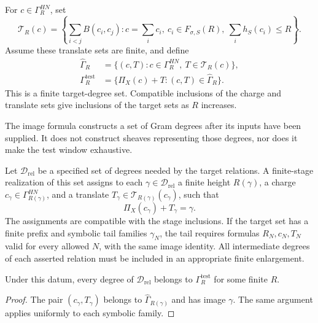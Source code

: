 \begin{definition}
\label{def:finite-target-test-window}
For \(c\in\Gamma_R^{HN}\), set
\[
 \mathcal T_R(c)=
 \left\{\sum_{i<j}B(c_i,c_j):
   c=\sum_i c_i,\ c_i\in F_{\sigma,S}(R),\
   \sum_i h_S(c_i)\le R\right\}.
\]
Assume these translate sets are finite, and define
\[
 \begin{split}
 \widehat\Gamma_R&=
    \{(c,T):c\in\Gamma_R^{HN},\ T\in\mathcal T_R(c)\},\\
 \Gamma_R^{\mathrm{test}}&=
    \{\Pi_X(c)+T:(c,T)\in\widehat\Gamma_R\}.
 \end{split}
\]
This is a finite target-degree set. Compatible inclusions of the
charge and translate sets give inclusions of the target sets as
\(R\) increases.
\end{definition}

The image formula constructs a set of Gram degrees after its inputs
have been supplied. It does not construct sheaves representing those
degrees, nor does it make the test window exhaustive.

\begin{definition}
\label{def:relation-closed-target-finite-r-exhaustion}
Let \(\mathcal D_{\mathrm{rel}}\) be a specified set of degrees
needed by the target relations. A finite-stage realization of this
set assigns to each \(\gamma\in\mathcal D_{\mathrm{rel}}\) a
finite height \(R(\gamma)\), a charge
\(c_\gamma\in\Gamma_{R(\gamma)}^{HN}\), and a translate
\(T_\gamma\in\mathcal T_{R(\gamma)}(c_\gamma)\), such that
\[
 \Pi_X(c_\gamma)+T_\gamma=\gamma.
\]
The assignments are compatible with the stage inclusions. If the
target set has a finite prefix and symbolic tail families
\(\gamma_N\), the tail requires formulas
\(R_N,c_N,T_N\) valid for every allowed \(N\), with the same
image identity. All intermediate degrees of each asserted relation
must be included in an appropriate finite enlargement.
\end{definition}

\begin{proposition}
\label{prop:relation-closed-target-finite-r-exhaustion-criterion}
Under this datum, every degree of \(\mathcal D_{\mathrm{rel}}\)
belongs to \(\Gamma_R^{\mathrm{test}}\) for some finite \(R\).
\end{proposition}
\begin{proof}
The pair \((c_\gamma,T_\gamma)\) belongs to
\(\widehat\Gamma_{R(\gamma)}\) and has image \(\gamma\).
The same argument applies uniformly to each symbolic family.
\end{proof}

